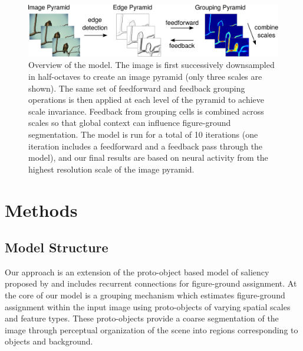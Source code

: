\documentclass[12pt]{article}
\begin{document}

\begin{figure}[t]
\hfill
\begin{center}
\includegraphics[width=\textwidth]{figs/model_scheme_new.eps}
\end{center}
\caption{Overview of the model. The image is first successively downsampled in half-octaves to create an image pyramid (only three scales are shown). The same set of feedforward and feedback grouping operations is then applied at each level of the pyramid to achieve scale invariance. Feedback from grouping cells is combined across scales so that
global context can influence figure-ground segmentation. The model is run for a total of 10 iterations (one iteration includes a feedforward and a feedback pass through the model), and our final results are based on neural activity from the highest resolution scale of the image pyramid.}
\label{Fig:model_overview}
\end{figure}

\section{Methods} 
\label{sec:model}
\subsection{Model Structure}

Our approach is an extension of the 
proto-object based model of saliency proposed by
\cite{Russell_etal14} and includes recurrent connections for figure-ground assignment.
%
At the core of our model is a grouping mechanism which estimates figure-ground assignment within the input image using proto-objects of varying spatial scales and feature types. These proto-objects provide a coarse segmentation of the image through perceptual organization of the scene into regions corresponding to objects and background.
 
\end{document}
